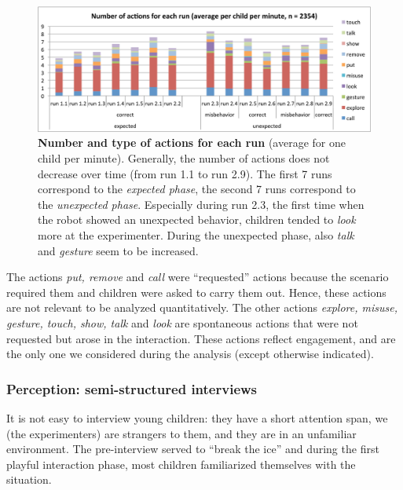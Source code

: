 \documentclass{sig-alternate}
\begin{document}
\begin{figure}[ht!] 
    \centering 
    \includegraphics[width=0.8\linewidth]{domino-time-all.pdf} 
    \caption{\small \textbf{Number and type of actions for each run} (average for
    one child per minute). Generally, the number of actions does not decrease over
    time (from run 1.1 to run 2.9). The first 7 runs correspond to the
    \textit{expected phase}, the second 7 runs correspond to the \textit{unexpected
    phase}. Especially during run 2.3, the first time when the robot showed an
    unexpected behavior, children tended to \textit{look} more at the experimenter.
    During the unexpected phase, also \textit{talk} and \textit{gesture} seem to be
    increased.}

    \label{fig:domino-time-all} 
\end{figure}

The actions \textit{put, remove} and \textit{call} were ``requested'' actions
because the scenario required them and children were asked to carry them out.
Hence, these actions are not relevant to be analyzed quantitatively. The other
actions \textit{explore, misuse, gesture, touch, show, talk} and \textit{look}
are spontaneous actions that were not requested but arose in the interaction.
These actions reflect engagement, and are the only one we considered during the
analysis (except otherwise indicated).

\subsubsection{Perception: semi-structured interviews}


It is not easy to interview young children: they have a short attention span, we
(the experimenters) are strangers to them, and they are in an unfamiliar
environment. The pre-interview served to ``break the ice'' and during the first
playful interaction phase, most children familiarized themselves with the
situation.
\end{document}
